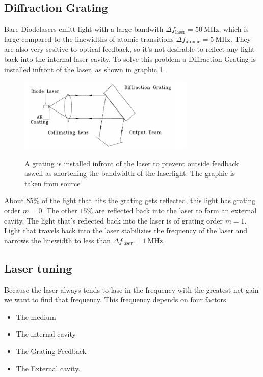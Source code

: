 \subsection{Diffraction Grating}
Bare Diodelasers emitt light with a large bandwith $\Delta f_\text{laser} = \SI{50}{\mega\Hz}$, which is large compared to the linewidths of atomic transitions $\Delta f_\text{atomic} = \SI{5}{\mega\Hz}$.
They are also very sesitive to optical feedback, so it's not desirable to reflect any light back into the internal laser cavity.
To solve this problem a Diffraction Grating is installed infront of the laser, as shown in graphic \ref{fig:grating}.

\begin{figure}
    \centering
    \caption{A grating is installed infront of the laser to prevent outside feedback aswell as shortening the bandwidth of the laserlight. The graphic is taken from source \cite[5]{anleitung_laser}}
    \includegraphics[width=0.75\textwidth]{content/data/grating.png}
    \label{fig:grating}
\end{figure}

About $85\%$ of the light that hits the grating gets reflected, this light has grating order $m=0$.
The other $15\%$ are reflected back into the laser to form an external cavity.
The light that's reflected back into the laser is of grating order $m=1$.
Light that travels back into the laser stabilizies the frequency of the laser and narrows the linewidth to less than $\Delta f_\text{laser} = \SI{1}{\mega\Hz}$.


\subsection{Laser tuning}
Because the laser always tends to lase in the frequency with the greatest net gain we want to find that frequency.
This frequency depends on four factors 

\begin{itemize}
    \item The medium
    \item The internal cavity
    \item The Grating Feedback
    \item The External cavity.
\end{itemize}


